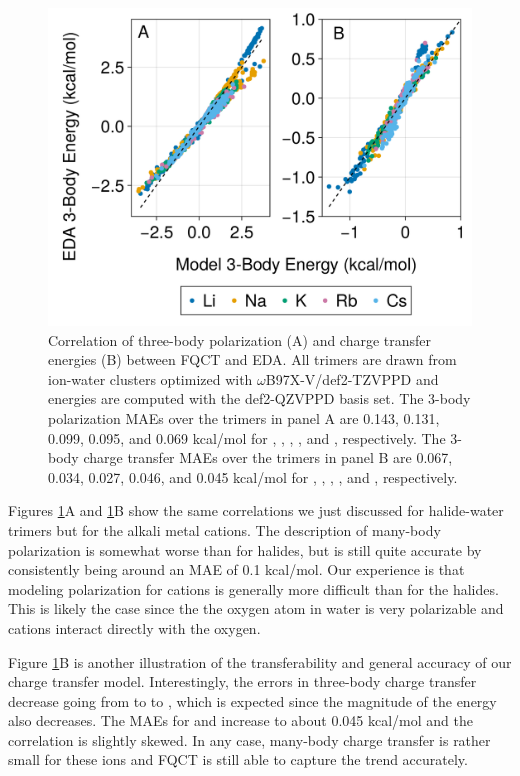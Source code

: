 \documentclass[journal=jacsat,manuscript=article]{achemso}
\begin{document}
\begin{figure}[h]
  \includegraphics*[width=\textwidth]{figures/three_body_pol_and_ct_cations.png}
  \caption{Correlation of three-body polarization (A) and charge transfer energies (B)
  between FQCT and EDA. All trimers are drawn from ion-water clusters optimized
  with $\omega$B97X-V/def2-TZVPPD and energies are computed with the def2-QZVPPD basis set.
  The 3-body polarization MAEs over the trimers in panel A are 0.143, 0.131, 0.099,
  0.095, and 0.069 kcal/mol for , , , , and ,
  respectively. The 3-body charge transfer MAEs over the trimers in panel B are
  0.067, 0.034, 0.027, 0.046, and 0.045 kcal/mol for , , , , and ,
  respectively.
}
  \label{fig:alkali_3b}
\end{figure}

Figures \ref{fig:alkali_3b}A and \ref{fig:alkali_3b}B show the same correlations we just discussed
for halide-water trimers but for the alkali metal cations. The description of many-body polarization
is somewhat worse than for halides, but is still quite accurate by consistently being around
an MAE of 0.1 kcal/mol. Our experience is that modeling polarization for cations is generally
more difficult than for the halides. This is likely the case since the the oxygen atom in water
is very polarizable and cations interact directly with the oxygen.

Figure \ref{fig:alkali_3b}B is another illustration of the transferability and general accuracy
of our charge transfer model. Interestingly, the errors in three-body charge transfer decrease
going from  to  to , which is expected since the magnitude
of the energy also decreases. The MAEs for  and  increase to about 0.045 kcal/mol
and the correlation is slightly skewed. In any case, many-body charge transfer is rather small
for these ions and FQCT is still able to capture the trend accurately.
\end{document}
